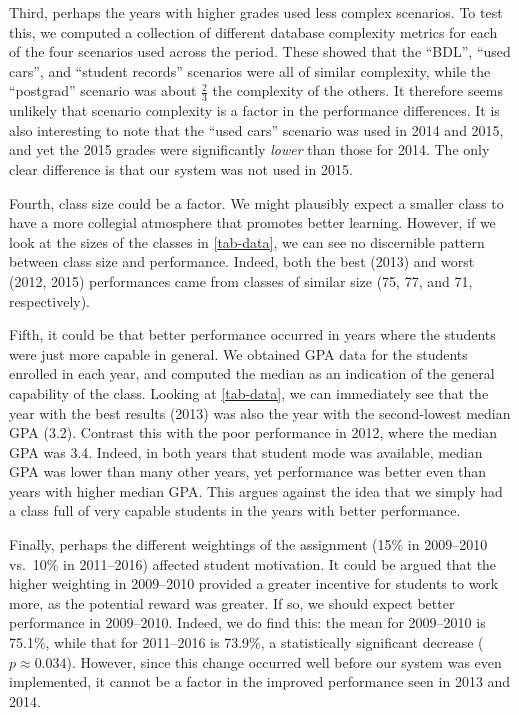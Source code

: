 \documentclass[sigconf, authordraft, capitalise]{acmart}
\begin{document}
Third, perhaps the years with higher grades used less complex scenarios. To test this, we computed a collection of different database complexity metrics \cite{Jamil.B-2010a-SMARtS,Piattini.M-2001a-Table,Pavlic.M-2008a-Database,Calero.C-2001a-Database,Sinha.B-2014a-Estimation} for each of the four scenarios used across the period. These showed that the ``BDL'', ``used cars'', and ``student records'' scenarios were all of similar complexity, while the ``postgrad'' scenario was about \(\frac{2}{3}\) the complexity of the others. It therefore seems unlikely that scenario complexity is a factor in the performance differences. It is also interesting to note that the ``used cars'' scenario was used in 2014 and 2015, and yet the 2015 grades were significantly \emph{lower} than those for 2014. The only clear difference is that our system was not used in 2015.

Fourth, class size could be a factor. We might plausibly expect a smaller class to have a more collegial atmosphere that promotes better learning. However, if we look at the sizes of the classes in \cref{tab-data}, we can see no discernible pattern between class size and performance. Indeed, both the best (2013) and worst (2012, 2015) performances came from classes of similar size (75, 77, and 71, respectively).

Fifth, it could be that better performance occurred in years where the students were just more capable in general. We obtained GPA data for the students enrolled in each year, and computed the median as an indication of the general capability of the class. Looking at \cref{tab-data}, we can immediately see that the year with the best results (2013) was also the year with the second-lowest median GPA (3.2). Contrast this with the poor performance in 2012, where the median GPA was 3.4. Indeed, in both years that student mode was available, median GPA was lower than many other years, yet performance was better even than years with higher median GPA. This argues against the idea that we simply had a class full of very capable students in the years with better performance.

Finally, perhaps the different weightings of the assignment (15\% in 2009--2010 vs.\ 10\% in 2011--2016) affected student motivation. It could be argued that the higher weighting in 2009--2010 provided a greater incentive for students to work more, as the potential reward was greater. If so, we should expect better performance in 2009--2010. Indeed, we do find this: the mean for 2009--2010 is 75.1\%, while that for 2011--2016 is 73.9\%, a statistically significant decrease (\(p \approx 0.034\)). However, since this change occurred well before our system was even implemented, it cannot be a factor in the improved performance seen in 2013 and 2014.
\end{document}

